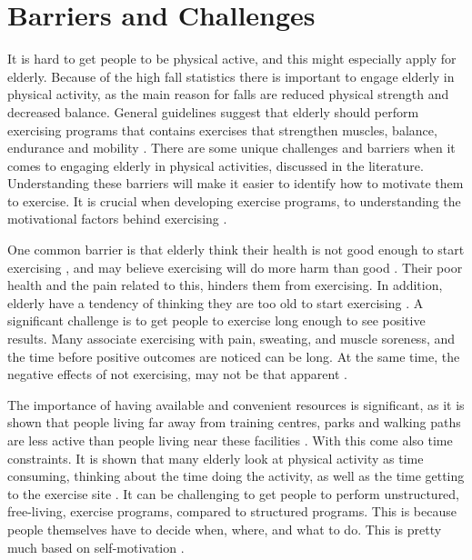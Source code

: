 \section{Barriers and Challenges}
\label{sec:barriers}
It is hard to get people to be physical active, and this might especially apply for elderly. Because of the high fall statistics there is important to engage elderly in physical activity, as the main reason for falls are reduced physical strength and decreased balance. General guidelines suggest that elderly should perform exercising programs that contains exercises that strengthen muscles, balance, endurance and mobility \cite{aktivitetsbok} \cite{gruppetrening-trheim}. There are some unique challenges and barriers when it comes to engaging elderly in physical activities, discussed in the literature. Understanding these barriers will make it easier to identify how to motivate them to exercise. It is crucial when developing exercise programs, to understanding the motivational factors behind exercising \cite{chao}.

One common barrier is that elderly think their health is not good enough to start exercising \cite{schutzer}, and may believe exercising will do more harm than good \cite{chao}. Their poor health and the pain related to this, hinders them from exercising. In addition, elderly have a tendency of thinking they are too old to start exercising \cite{schutzer}. A significant challenge is to get people to exercise long enough to see positive results. Many associate exercising with pain, sweating, and muscle soreness, and the time before positive outcomes are noticed can be long. At the same time, the negative effects of not exercising, may not be that apparent \cite{chao}. 

The importance of having available and convenient resources is significant, as it is shown that people living far away from training centres, parks and walking paths are less active than people living near these facilities \cite{schutzer}. With this come also time constraints. It is shown that many elderly look at physical activity as time consuming, thinking about the time doing the activity, as well as the time getting to the exercise site \cite{schutzer} \cite{chao}. It can be challenging to get people to perform unstructured, free-living, exercise programs, compared to structured programs. This is because people themselves have to decide when, where, and what to do. This is pretty much based on self-motivation \cite{chao}.  

